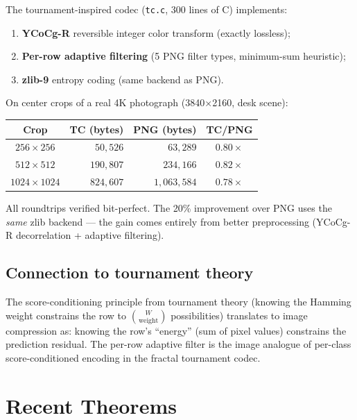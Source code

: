 \documentclass[11pt,a4paper]{article}
\theoremstyle{definition}
\theoremstyle{remark}
\begin{document}
The tournament-inspired codec (\texttt{tc.c}, 300 lines of C) implements:
\begin{enumerate}
\item \textbf{YCoCg-R} reversible integer color transform (exactly lossless);
\item \textbf{Per-row adaptive filtering} (5 PNG filter types, minimum-sum heuristic);
\item \textbf{zlib-9} entropy coding (same backend as PNG).
\end{enumerate}

On center crops of a real 4K photograph (3840$\times$2160, desk scene):

\begin{center}
\begin{tabular}{c r r c}
\toprule
Crop & TC (bytes) & PNG (bytes) & TC/PNG \\
\midrule
$256\times 256$ & $50{,}526$ & $63{,}289$ & $0.80\times$ \\
$512\times 512$ & $190{,}807$ & $234{,}166$ & $0.82\times$ \\
$1024\times 1024$ & $824{,}607$ & $1{,}063{,}584$ & $0.78\times$ \\
\bottomrule
\end{tabular}
\end{center}

\noindent All roundtrips verified bit-perfect. The 20\% improvement over PNG uses the \emph{same} zlib backend --- the gain comes entirely from better preprocessing (YCoCg-R decorrelation + adaptive filtering).

\subsection{Connection to tournament theory}

The score-conditioning principle from tournament theory (knowing the Hamming weight constrains the row to $\binom{W}{\text{weight}}$ possibilities) translates to image compression as: knowing the row's ``energy'' (sum of pixel values) constrains the prediction residual. The per-row adaptive filter is the image analogue of per-class score-conditioned encoding in the fractal tournament codec.

\section{Recent Theorems}
\label{sec:recent}
\end{document}
